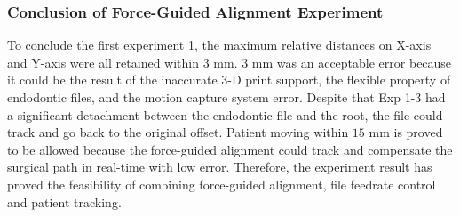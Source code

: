 \subsubsection{Conclusion of Force-Guided Alignment Experiment}
\hspace*{6mm}To conclude the first experiment 1, the maximum relative distances on X-axis and Y-axis were all retained within $3$ mm. $3$ mm was an acceptable error because it could be the result of the inaccurate 3-D print support, the flexible property of endodontic files, and the motion capture system error. Despite that Exp 1-3 had a significant detachment between the endodontic file and the root, the file could track and go back to the original offset. Patient moving within $15$ mm is proved to be allowed because the force-guided alignment could track and compensate the surgical path in real-time with low error. Therefore, the experiment result has proved the feasibility of combining force-guided alignment, file feedrate control and patient tracking.

\newpage

